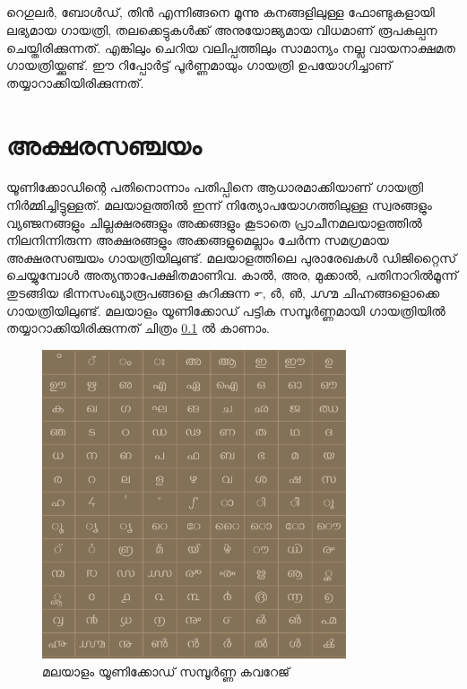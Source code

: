 \documentclass[12pt]{report}
\begin{document}
	\paragraph{}
	റെഗുലര്‍, ബോള്‍ഡ്, തിന്‍ എന്നിങ്ങനെ മൂന്നു കനങ്ങളിലുള്ള ഫോണ്ടുകളായി ലഭ്യമായ ഗായത്രി, തലക്കെട്ടുകള്‍ക്ക് അനുയോജ്യമായ വിധമാണ് രൂപകല്പന ചെയ്തിരിക്കുന്നത്. എങ്കിലും ചെറിയ വലിപ്പത്തിലും സാമാന്യം നല്ല വായനാക്ഷമത ഗായത്രിയ്ക്കുണ്ട്. ഈ റിപ്പോര്‍ട്ട് പൂര്‍ണ്ണമായും ഗായത്രി  ഉപയോഗിച്ചാണ് തയ്യാറാക്കിയിരിക്കുന്നത്.
	
\thispagestyle{empty}
\clearpage
	\chapter*{ അക്ഷരസഞ്ചയം}
	

	
	യൂണിക്കോഡിന്റെ പതിനൊന്നാം പതിപ്പിനെ ആധാരമാക്കിയാണ് ഗായത്രി നിര്‍മ്മിച്ചിട്ടുള്ളത്. മലയാളത്തില്‍ ഇന്ന് നിത്യോപയോഗത്തിലുള്ള സ്വരങ്ങളും വ്യഞ്ജനങ്ങളും ചില്ലക്ഷരങ്ങളും അക്കങ്ങളും കൂടാതെ പ്രാചീനമലയാളത്തില്‍ നിലനിന്നിരുന്ന അക്ഷരങ്ങളും അക്കങ്ങളുമെല്ലാം ചേര്‍ന്ന സമഗ്രമായ അക്ഷരസഞ്ചയം ഗായത്രിയിലുണ്ട്. മലയാളത്തിലെ പുരാരേഖകള്‍ ഡിജിറ്റൈസ് ചെയ്യുമ്പോള്‍ അത്യന്താപേക്ഷിതമാണിവ. കാല്‍, അര, മുക്കാല്‍, പതിനാറില്‍മൂന്ന് തുടങ്ങിയ ഭിന്നസംഖ്യാരൂപങ്ങളെ കുറിക്കുന്ന ൳, ൴, ൵, ൸ ചിഹ്നങ്ങളൊക്കെ ഗായത്രിയിലുണ്ട്. മലയാളം യൂണിക്കോഡ് പട്ടിക സമ്പൂർണ്ണമായി ഗായത്രിയിൽ തയ്യാറാക്കിയിരിക്കുന്നത് ചിത്രം \ref{unicode} ല്‍ കാണാം.
	
	\begin{figure}
		\begin{centering}
			\includegraphics[width=0.8\textwidth]{ml-unicode.png}
			\caption{മലയാളം യൂണിക്കോഡ് സമ്പൂര്‍ണ്ണ കവറേജ്}
			\label{unicode}
		\end{centering}
	\end{figure}
	
\end{document}
